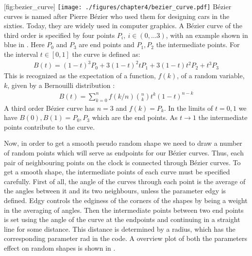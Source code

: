 [fig:bezier_curve]
{\texttt{[image: ./figures/chapter4/bezier\_curve.pdf]}}
Bézier curves is named after Pierre Bézier \cite{BezierCurve2020} who used them for designing cars in the sixties. Today, they are widely used in computer graphics. A Bézier curve of the third order is specified by four points $P_i, \: i \in (0,\dots 3)$, with an example shown in blue in . Here $P_0$ and $P_3$ are end points and $P_1,P_2$ the intermediate points. For the interval $t \in [0,1]$ the curve is defined as:
\begin{align}
	B(t) = (1-t)^3 P_0 + 3(1-t)^2 t P_1 + 3 (1-t) t^2 P_2 + t^3 P_3 
\end{align}
This is recognized as the expectation of a function, $f(k)$, of a random variable, $k$, given by a Bernouilli distribution  \cite{cichonBernoulliSumsBernstein}:
\begin{align}
	B(t) = \sum_{k=0}^{n} f(k/n) \binom{n}{k} t^k (1-t)^{n-k}
\end{align}
A third order Bézier curve has $n=3$ and $f(k) = P_k$.
In the limits of $t = 0,1$ we have $B(0), B(1) = P_0, P_3$ which are the end points. As $t \to 1$ the intermediate points contribute to the curve. 

Now, in order to get a smooth pseudo random shape we need to draw a number of random points which will serve as endpoints for our Bézier curves.
Thus, each pair of neighbouring points on the clock is connected through Bézier curves. 
To get a smooth shape, the intermediate points of each curve must be specified carefully.
First of all, the angle of the curves through each point is the average of the angles between it and its two neighbours, unless the parameter edgy is defined. 
Edgy controls the edginess of the corners of the shapes by being a weight in the averaging of angles.
Then the intermediate points between two end points is set using the angle of the curve at the endpoints and continuing in a straight line for some distance. 
This distance is determined by a radius, which has the corresponding parameter rad in the code.
A overview plot of both the parameters effect on random shapes is shown in . 

